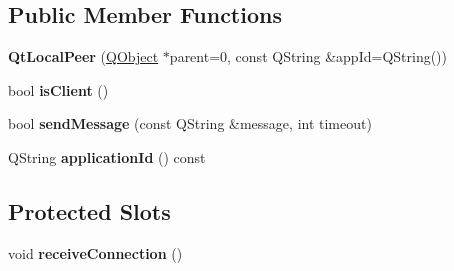 \subsection*{Public Member Functions}
\begin{DoxyCompactItemize}
\item 
{\bfseries Qt\+Local\+Peer} (\hyperlink{class_q_object}{Q\+Object} $\ast$parent=0, const Q\+String \&app\+Id=Q\+String())\hypertarget{class_qt_local_peer_a7f6f94203a6ece5b14c8c800da1e40ab}{}\label{class_qt_local_peer_a7f6f94203a6ece5b14c8c800da1e40ab}

\item 
bool {\bfseries is\+Client} ()\hypertarget{class_qt_local_peer_a72f4ec6cda404661094778f98296d2a9}{}\label{class_qt_local_peer_a72f4ec6cda404661094778f98296d2a9}

\item 
bool {\bfseries send\+Message} (const Q\+String \&message, int timeout)\hypertarget{class_qt_local_peer_ab239cb6dcea36512d43df6ca07881ea7}{}\label{class_qt_local_peer_ab239cb6dcea36512d43df6ca07881ea7}

\item 
Q\+String {\bfseries application\+Id} () const \hypertarget{class_qt_local_peer_a2f7d615b1eebd738a4025894d8e213d4}{}\label{class_qt_local_peer_a2f7d615b1eebd738a4025894d8e213d4}

\end{DoxyCompactItemize}
\subsection*{Protected Slots}
\begin{DoxyCompactItemize}
\item 
void {\bfseries receive\+Connection} ()\hypertarget{class_qt_local_peer_afb29397e8af380cac78af0b7535121d2}{}\label{class_qt_local_peer_afb29397e8af380cac78af0b7535121d2}

\end{DoxyCompactItemize}

